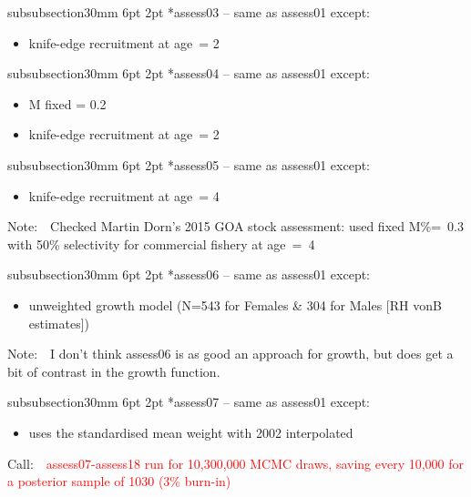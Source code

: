 \documentclass[11pt]{book}
\makeatletter
\newcommand{\red}[1]{{\textcolor{red} {#1}}}
\newcommand{\notecol}[1]{{\textcolor{notecol} {#1}}}
\renewcommand{\subsubsection}{\@startsection%
{subsubsection}{3}{0mm}%
{6pt \@plus -0pt \@minus -0pt}{2pt \@plus 0pt}%
{\normalfont\bf}}%
\newcommand\call[1]{
\footnotesize\selectfont\hangindent=0.35in
Call:~~\red{#1}
\normalsize\selectfont}
\newcommand\note[1]{
\footnotesize\selectfont\hangindent=0.35in
Note:~~\notecol{#1}
\normalsize\selectfont}
\makeatother
\begin{document}
\subsubsection*{assess03 -- same as assess01 except:}
\begin{itemize}[nosep]
  \item knife-edge recruitment at age~= 2
\end{itemize}

\subsubsection*{assess04 -- same as assess01 except:}
\begin{itemize}[nosep]
  \item M fixed = 0.2
  \item knife-edge recruitment at age~= 2
\end{itemize}

\subsubsection*{assess05 -- same as assess01 except:}
\begin{itemize}[nosep]
  \item knife-edge recruitment at age~= 4
\end{itemize}
\note{Checked Martin Dorn's 2015 GOA stock assessment: used fixed M\%=~0.3 with 50\% selectivity for commercial fishery at age~=~4}

\subsubsection*{assess06 -- same as assess01 except:}
\begin{itemize}[nosep]
  \item unweighted growth model (N=543 for Females \& 304 for Males [RH vonB estimates])
\end{itemize}
\note{I don't think assess06 is as good an approach for growth, but does get a bit of contrast in the growth function.}

\subsubsection*{assess07 -- same as assess01 except:}
\begin{itemize}[nosep]
  \item uses the standardised mean weight with 2002 interpolated
\end{itemize}
\call{assess07-assess18 run for 10,300,000 MCMC draws, saving every 10,000 for a posterior sample of 1030 (3\% burn-in)}
\end{document}
